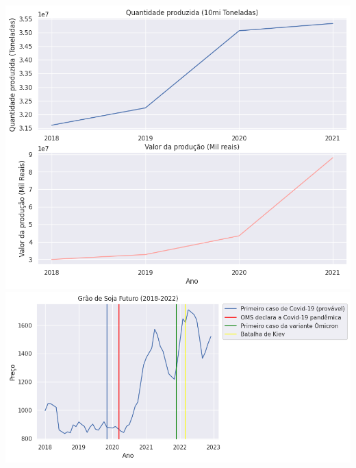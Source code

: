 \documentclass{article}
\begin{document}
\begin{center}
\includegraphics[scale=0.6]{soja_mt.png}
\includegraphics[scale=0.6]{soja_futuro.png}
\end{center}
\end{document}
